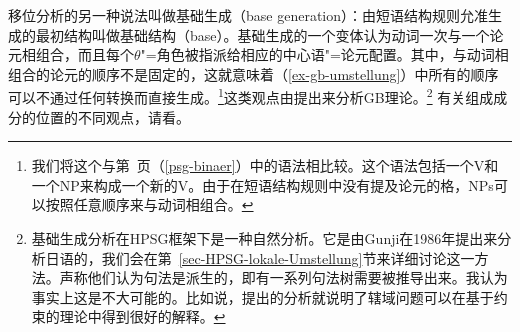 移位分析的另一种说法叫做基础生成（base generation）：由短语结构规则允准生成的最初结构叫做基础结构（base）。基础生成的一个变体认为动词一次与一个论元相组合，而且每个$\theta$"=角色被指派给相应的中心语"=论元配置。其中，与动词相组合的论元的顺序不是固定的，这就意味着（\ref{ex-gb-umstellung}）中所有的顺序可以不通过任何转换而直接生成。\footnote{
我们将这个与第~\pageref{psg-binaer}页（\ref{psg-binaer}）中的语法相比较。这个语法包括一个V和一个NP来构成一个新的V。由于在短语结构规则中没有提及论元的格，NPs可以按照任意顺序来与动词相组合。
}这类观点由\citet{Fanselow2001a}提出来分析GB理论。\footnote{%
基础生成分析在HPSG框架下是一种自然分析。它是由Gunji\nocite{Gunji86a}在1986年提出来分析日语的，我们会在第~\ref{sec-HPSG-lokale-Umstellung}节来详细讨论这一方法。\citet[--314]{SE2002a}声称他们认为句法是派生的，即有一系列句法树需要被推导出来。我认为事实上这是不大可能的。比如说，\citet{Kiss2001a}提出的分析就说明了辖域问题可以在基于约束的理论中得到很好的解释。
}
有关组成成分的位置的不同观点，请看。




